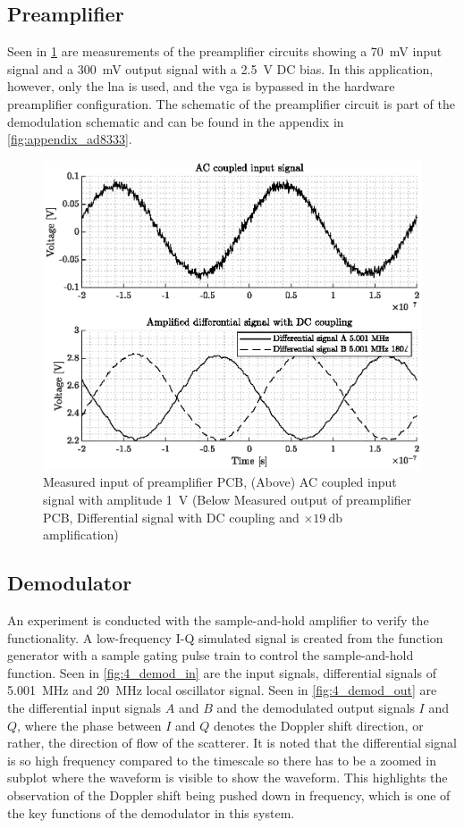 \subsection{Preamplifier}
Seen in \cref{fig:4_preamp_in} are measurements of the preamplifier circuits showing a \qty{70}{\milli\volt} input signal and a \qty{300}{\milli\volt} output signal with a \qty{2.5}{\volt} DC bias. In this application, however, only the \gls{lna} is used, and the \gls{vga} is bypassed in the hardware preamplifier configuration. The schematic of the preamplifier circuit is part of the demodulation schematic and can be found in the appendix in \cref{fig:appendix_ad8333}.
\begin{figure}[htbp]
	\centering
	\includegraphics[width=.8\textwidth]{Figures/4_preamplifier_pcb.eps}
	\caption[Measured input and output of preamplifier PCB]{Measured input of preamplifier PCB, (Above) AC coupled input signal with amplitude \qty{1}{\volt} (Below Measured output of preamplifier PCB, Differential signal with DC coupling and $\times \qty{19}{\decibel}$ amplification)}
	\label{fig:4_preamp_in}
\end{figure}

\subsection{Demodulator}
An experiment is conducted with the sample-and-hold amplifier to verify the functionality. A low-frequency I-Q simulated signal is created from the function generator with a sample gating pulse train to control the sample-and-hold function. Seen in \cref{fig:4_demod_in} are the input signals, differential signals of \qty{5.001}{\mega\hertz} and \qty{20}{\mega\hertz} local oscillator signal. Seen in \cref{fig:4_demod_out} are the differential input signals $A$ and $B$ and the demodulated output signals $I$ and $Q$, where the phase between $I$ and $Q$ denotes the Doppler shift direction, or rather, the direction of flow of the scatterer. It is noted that the differential signal is so high frequency compared to the timescale so there has to be a zoomed in subplot where the waveform is visible to show the waveform. This highlights the observation of the Doppler shift being pushed down in frequency, which is one of the key functions of the demodulator in this system.

